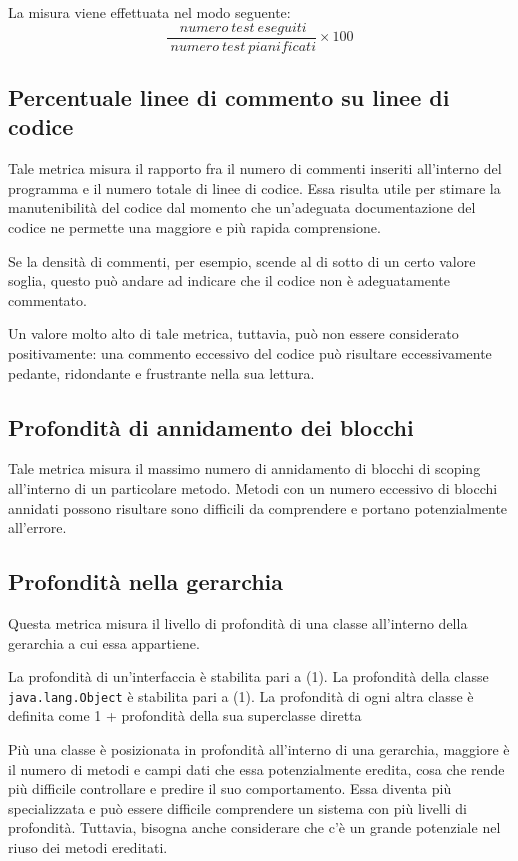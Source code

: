La misura viene effettuata nel modo seguente:
\begin{equation}
	\frac{~numero~test~eseguiti}{~numero~test~pianificati}\times{100}
\end{equation}


\subsection{Percentuale linee di commento su linee di codice}
Tale metrica misura il rapporto fra il numero di commenti inseriti all'interno del programma e il numero totale di linee di codice. Essa risulta utile per stimare la manutenibilità del codice dal momento che un'adeguata documentazione del codice ne permette una maggiore e più rapida comprensione.

Se la densità di commenti, per esempio, scende al di sotto di un certo valore soglia, questo può andare ad indicare che il codice non è adeguatamente commentato.

Un valore molto alto di tale metrica, tuttavia, può non essere considerato positivamente: una commento eccessivo del codice può risultare eccessivamente pedante, ridondante e frustrante nella sua lettura.


\subsection{Profondità di annidamento dei blocchi}
Tale metrica misura il massimo numero di annidamento di blocchi di scoping all'interno di un particolare metodo. Metodi con un numero eccessivo di blocchi annidati possono risultare sono difficili da comprendere e portano potenzialmente all'errore.


\subsection{Profondità nella gerarchia}
Questa metrica misura il livello di profondità di una classe all'interno della gerarchia a cui essa appartiene. 

La profondità di un'interfaccia è stabilita pari a (1). La profondità della classe \texttt{java.lang.Object} è stabilita pari a (1). La profondità di ogni altra classe è definita come 1 + profondità della sua superclasse diretta

Più una classe è posizionata in profondità all'interno di una gerarchia, maggiore è il numero di metodi e campi dati che essa potenzialmente eredita, cosa che rende più difficile controllare e predire il suo comportamento. Essa diventa più specializzata e può essere difficile comprendere un sistema con più livelli di profondità. Tuttavia, bisogna anche considerare che c'è un grande potenziale nel riuso dei metodi ereditati.

